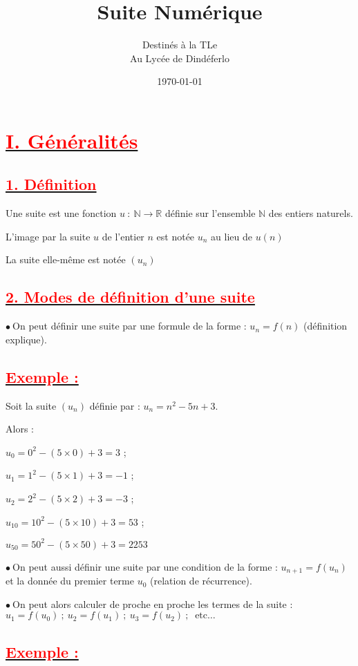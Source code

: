 \documentclass[12pt]{article}
\author{Destinés à la TLe\\Au Lycée de Dindéferlo}
\title{\textbf{Suite Numérique }}
\date{\today}
\begin{document}
\maketitle
\newpage
\section*{\underline{\textbf{\textcolor{red}{I. Généralités}}}}
\subsection*{\underline{\textbf{\textcolor{red}{1. Définition}}}}
Une suite est une fonction $u\ :\ \mathbb{N}\longrightarrow\mathbb{R}$ définie sur l'ensemble $\mathbb{N}$ des entiers naturels.
	
L'image par la suite $u$ de l'entier $n$ est notée $u_{n}$ au lieu de $u(n)$
	
La suite elle-même est notée $\left(u_{n}\right)$
\subsection*{\underline{\textbf{\textcolor{red}{2. Modes de définition d'une suite }}}}
$\bullet\ $On peut définir une suite par une formule de la forme : $u_{n}=f(n)$ (définition explique).
\subsection*{\underline{\textbf{\textcolor{red}{Exemple :}}}}
Soit la suite $\left(u_{n}\right)$ définie par : $u_{n}=n^{2}-5n+3.$

Alors :
 
$u_{0}=0^{2}-(5\times 0)+3=3$ ;
	
$u_{1}=1^{2}-(5\times 1)+3=-1$ ;
	
$u_{2}=2^{2}-(5\times 2)+3=-3$ ;
	
$u_{10}=10^{2}-(5\times 10)+3=53$ ;
	
$u_{50}=50^{2}-(5\times 50)+3=2253$
	
$\bullet\ $On peut aussi définir une suite par une condition de la forme : $u_{n+1}=f\left(u_{n}\right)$ et la donnée du premier terme $u_{0}$ (relation de récurrence).
	
$\bullet\ $On peut alors calculer de proche en proche les termes de la suite : $u_{1}=f\left(u_{0}\right)\ ;\ u_{2}=f\left(u_{1}\right)\ ;\ u_{3}=f\left(u_{2}\right)\ ;\ \text{ etc}\ldots$
\subsection*{\underline{\textbf{\textcolor{red}{Exemple :}}}}
	
\end{document}
